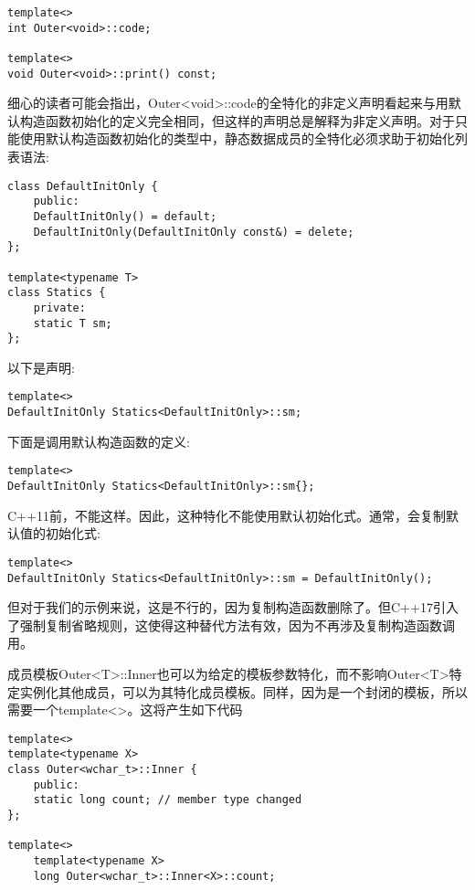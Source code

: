 \begin{lstlisting}[style=styleCXX]
template<>
int Outer<void>::code;

template<>
void Outer<void>::print() const;
\end{lstlisting}

细心的读者可能会指出，Outer<void>::code的全特化的非定义声明看起来与用默认构造函数初始化的定义完全相同，但这样的声明总是解释为非定义声明。对于只能使用默认构造函数初始化的类型中，静态数据成员的全特化必须求助于初始化列表语法:

\begin{lstlisting}[style=styleCXX]
class DefaultInitOnly {
	public:
	DefaultInitOnly() = default;
	DefaultInitOnly(DefaultInitOnly const&) = delete;
};

template<typename T>
class Statics {
	private:
	static T sm;
};
\end{lstlisting}

以下是声明:

\begin{lstlisting}[style=styleCXX]
template<>
DefaultInitOnly Statics<DefaultInitOnly>::sm;
\end{lstlisting}

下面是调用默认构造函数的定义:

\begin{lstlisting}[style=styleCXX]
template<>
DefaultInitOnly Statics<DefaultInitOnly>::sm{};
\end{lstlisting}

C++11前，不能这样。因此，这种特化不能使用默认初始化式。通常，会复制默认值的初始化式:

\begin{lstlisting}[style=styleCXX]
template<>
DefaultInitOnly Statics<DefaultInitOnly>::sm = DefaultInitOnly();
\end{lstlisting}

但对于我们的示例来说，这是不行的，因为复制构造函数删除了。但C++17引入了强制复制省略规则，这使得这种替代方法有效，因为不再涉及复制构造函数调用。

成员模板Outer<T>::Inner也可以为给定的模板参数特化，而不影响Outer<T>特定实例化其他成员，可以为其特化成员模板。同样，因为是一个封闭的模板，所以需要一个template<>。这将产生如下代码

\begin{lstlisting}[style=styleCXX]
template<>
template<typename X>
class Outer<wchar_t>::Inner {
	public:
	static long count; // member type changed
};

template<>
	template<typename X>
	long Outer<wchar_t>::Inner<X>::count;
\end{lstlisting}

